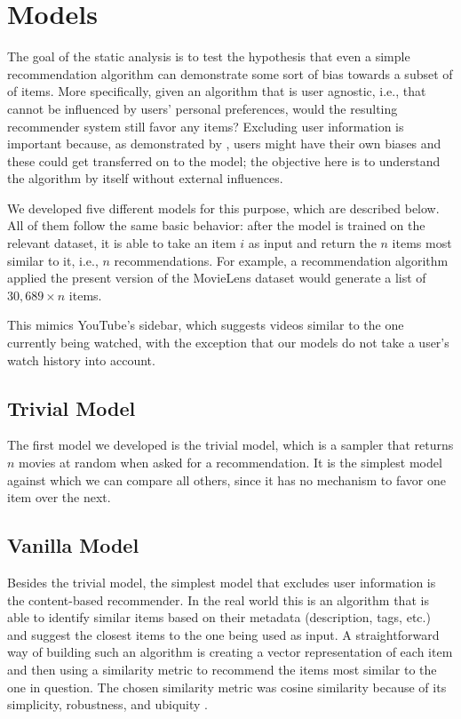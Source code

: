 \section{Models}
\label{sec:models}

The goal of the static analysis is to test the hypothesis that even a simple
recommendation algorithm can demonstrate some sort of bias towards a subset of
of items. More specifically, given an algorithm that is user agnostic, i.e.,
that cannot be influenced by users' personal preferences, would the resulting
recommender system still favor any items? Excluding user information is
important because, as demonstrated by \citet{stoica_algorithmic_2018}, users
might have their own biases and these could get transferred on to the model; the
objective here is to understand the algorithm by itself without external
influences.

We developed five different models for this purpose, which are described below.
All of them follow the same basic behavior: after the model is trained on the
relevant dataset, it is able to take an item $i$ as input and return the $n$
items most similar to it, i.e., $n$ recommendations. For example, a
recommendation algorithm applied the present version of the MovieLens dataset
would generate a list of $30,689 \times n$ items.

This mimics YouTube's sidebar, which suggests videos similar to the one
currently being watched, with the exception that our models do not take a user's
watch history into account.

\subsection{Trivial Model}
\label{subsec:trivial}

The first model we developed is the trivial model, which is a sampler that
returns $n$ movies at random when asked for a recommendation. It is the simplest
model against which we can compare all others, since it has no mechanism to
favor one item over the next.

\subsection{Vanilla Model}
\label{subsec:vanilla}

Besides the trivial model, the simplest model that excludes user information is
the content-based recommender. In the real world this is an algorithm that is
able to identify similar items based on their metadata (description, tags, etc.)
and suggest the closest items to the one being used as input. A straightforward
way of building such an algorithm is creating a vector representation of each
item and then using a similarity metric to recommend the items most similar to
the one in question. The chosen similarity metric was cosine similarity because
of its simplicity, robustness, and ubiquity \citep{sarwar_item-based_2001}.

